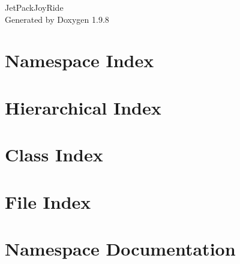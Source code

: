 \documentclass[twoside]{book}
\newcommand{\+}{\discretionary{\mbox{\scriptsize$\hookleftarrow$}}{}{}}
\newcommand{\clearemptydoublepage}{%
    \newpage{\pagestyle{empty}\cleardoublepage}%
  }
\begin{document}
  \raggedbottom
    \hypersetup{pageanchor=false,
                bookmarksnumbered=true,
                pdfencoding=unicode
               }
  \begin{titlepage}
  \vspace*{7cm}
  \begin{center}%
  {\Large Jet\+Pack\+Joy\+Ride}\\
  \vspace*{1cm}
  {\large Generated by Doxygen 1.9.8}\\
  \end{center}
  \end{titlepage}
  \clearemptydoublepage
  \tableofcontents
  \clearemptydoublepage
  \hypersetup{pageanchor=true}

\chapter{Namespace Index}

\chapter{Hierarchical Index}

\chapter{Class Index}

\chapter{File Index}

\chapter{Namespace Documentation}


\end{document}
